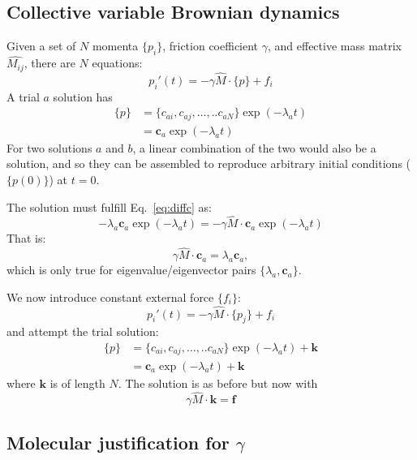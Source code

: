 \documentclass[11pt]{article}
\newcommand{\vek}[1]{\boldsymbol{#1}}          %
\begin{document}
\subsection{Collective variable Brownian dynamics}

Given a set of $N$ momenta $\{p_i\}$, friction coefficient $\gamma$, and effective mass matrix $\hat{M_{ij}}$, there are $N$ equations:
\begin{equation}
\label{eq:diffc}
p_i'(t) = - \gamma \hat{M} \cdot \{p\} + f_i 
\end{equation}
A trial $a$ solution has
\begin{align}
\{ p \} &= \{ c_{ai}, c_{aj}, \ldots, .. c_{aN} \} \exp(-\lambda_a t) \\
        &= \vek{c}_a \exp(-\lambda_a t)
\end{align}
For two solutions $a$ and $b$, a linear combination of the two would also be a solution, and so they can be assembled to reproduce arbitrary initial conditions ($\{ p(0) \}$) at $t=0$.

The solution must fulfill Eq.~\ref{eq:diffc} as:
\begin{equation}
-\lambda_a \vek{c}_a \exp(-\lambda_a t) = -\gamma \hat{M} \cdot \vek{c}_a \exp(-\lambda_a t)
\end{equation}
That is:
\begin{equation}
\gamma \hat{M} \cdot \vek{c}_a = \lambda_a \vek{c}_a,
\end{equation}
which is only true for eigenvalue/eigenvector pairs $\{\lambda_a, \vek{c}_a\}$.

We now introduce constant external force $\{f_i\}$:
\begin{equation}
\label{eq:diffc2}
p_i'(t) = - \gamma \hat{M} \cdot \{p_j\} + f_i 
\end{equation}
and attempt the trial solution:
\begin{align}
\{ p \} &= \{ c_{ai}, c_{aj}, \ldots, .. c_{aN} \} \exp(-\lambda_a t) + \vek{k} \\
        &= \vek{c}_a \exp(-\lambda_a t) + \vek{k}
\end{align}
where $\vek{k}$ is of length $N$.
The solution is as before but now with
\begin{equation}
\gamma \hat{M} \cdot \vek{k} = \vek{f}
\end{equation}

\subsection{Molecular justification for $\gamma$}
\end{document}
